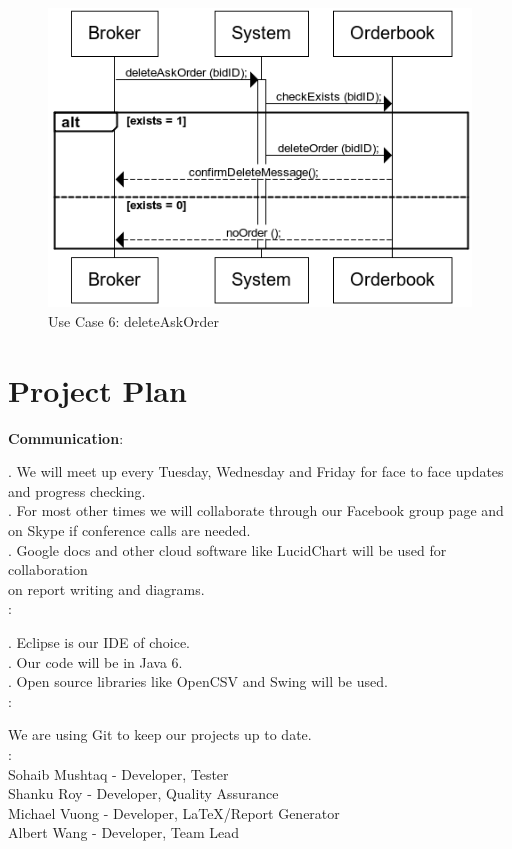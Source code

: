 \documentclass[a4paper]{article}
\begin{document}
\begin{figure}[H]
   \includegraphics[width=1\textwidth]{images/deleteAskOrder}
   \caption{Use Case 6: deleteAskOrder}
\end{figure}

\section {Project Plan}

{\bf Communication}: 

\indent{}.  We will meet up every Tuesday, Wednesday and Friday for face to face updates and progress checking. \\
\indent{}. For most other times we will collaborate through our Facebook group page and \\
on Skype if conference calls are needed. \\
\indent{}. Google docs and other cloud software like LucidChart will be used for collaboration \\
 on report writing and diagrams. \\

:

\indent{}. Eclipse is our IDE of choice. \\
\indent{}. Our code will be in Java 6. \\
\indent{}. Open source libraries like OpenCSV and Swing will be used. \\

:

We are using Git to keep our projects up to date. \\

: \\
\indent\indent Sohaib Mushtaq - Developer, Tester \\
\indent\indent Shanku Roy - Developer, Quality Assurance \\
\indent\indent Michael Vuong - Developer, LaTeX/Report Generator \\
\indent\indent Albert Wang -  Developer, Team Lead \\
\end{document}
